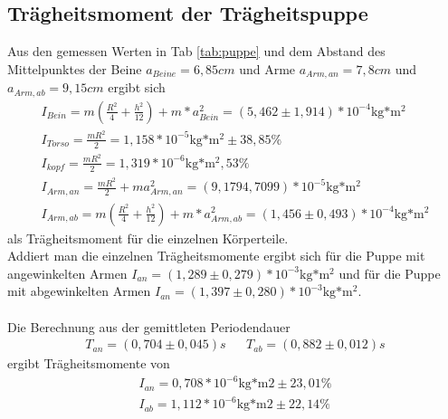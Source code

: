 \subsection{Trägheitsmoment der Trägheitspuppe}

Aus den gemessen Werten in Tab \ref{tab:puppe} und dem Abstand des Mittelpunktes der Beine $a_{Beine}=6,85cm$ und Arme $a_{Arm,an}=7,8cm$ und $a_{Arm,ab}=9,15cm$ ergibt sich
\begin{align}
I_{Bein}=m\left(\frac{R^2}{4}+\frac{h^2}{12}\right)+m*a_{Bein}^2=(5,462\pm1,914)*10^{-4}\text{kg*m$^2$}\\
I_{Torso}=\frac{mR^2}{2}=1,158*10^{-5}\text{kg*m$^2$}\pm38,85\%\\
I_{kopf}=\frac{mR^2}{2}=1,319*10^{-6}\text{kg*m$^2$},53\%\\
I_{Arm,an}=\frac{mR^2}{2}+ma_{Arm,an}^2=(9,1794,7099)*10^{-5}\text{kg*m$^2$}\\
I_{Arm,ab}=m\left(\frac{R^2}{4}+\frac{h^2}{12}\right)+m*a_{Arm,ab}^2=(1,456\pm0,493)*10^{-4}\text{kg*m$^2$}
\end{align}
als Trägheitsmoment für die einzelnen Körperteile.
\\
Addiert man die einzelnen Trägheitsmomente ergibt sich für die Puppe mit angewinkelten Armen $I_{an}=(1,289\pm0,279)*10^{-3}\text{kg*m$^2$}$ und für die Puppe mit abgewinkelten Armen $I_{an}=(1,397\pm0,280)*10^{-3}\text{kg*m$^2$}$.
\\
\\
Die Berechnung aus der gemittleten Periodendauer
\begin{align*}
&T_{an}=(0,704\pm0,045)s&
&T_{ab}=(0,882\pm0,012)s&
\end{align*}
ergibt Trägheitsmomente von
\begin{align*}
I_{an}=0,708*10^{-6}\text{kg*m2}\pm23,01\%\\
I_{ab}=1,112*10^{-6}\text{kg*m2}\pm22,14\%
\end{align*}